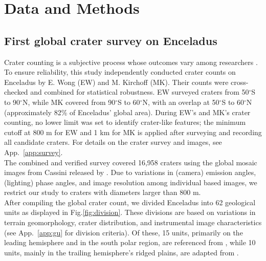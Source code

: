 \documentclass[preprint,12pt,3p,times,authoryear]{elsarticle}
\begin{document}

\section{Data and Methods} 
\label{sec:data}

\subsection{First global crater survey on Enceladus}
\label{subsec:crater_count}
Crater counting is a subjective process whose outcomes vary among researchers \citep{Robbins2014}. To ensure reliability, this study independently conducted crater counts on Enceladus by E. Wong (EW) and M. Kirchoff (MK). Their counts were cross-checked and combined for statistical robustness. EW surveyed craters from 50$^\circ$S to 90$^\circ$N, while MK covered from 90$^\circ$S to 60$^\circ$N, with an overlap at 50$^\circ$S to 60$^\circ$N (approximately 82\% of Enceladus' global area). During EW’s and MK’s crater counting, no lower limit was set to identify crater-like features; the minimum cutoff at 800 m for EW and 1 km for MK is applied after surveying and recording all candidate craters. For details on the crater survey and images, see App.~\ref{app:survey}.\\

The combined and verified survey covered 16,958 craters using the global mosaic images from Cassini released by \citet{Bland2018}. Due to variations in (camera) emission angles, (lighting) phase angles, and image resolution among individual based images, we restrict our study to craters with diameters larger than 800 m. \\

After compiling the global crater count, we divided Enceladus into 62 geological units as displayed in  Fig.\ref{fig:division}. These divisions are based on variations in terrain geomorphology, crater distribution, and instrumental image characteristics (see App.~\ref{app:gu} for division criteria).
Of these, 15 units, primarily on the leading hemisphere and in the south polar region, are referenced from \citet{CrowWillard2015}, while 10 units, mainly in the trailing hemisphere’s ridged plains, are adapted from \citet{Kirchoff2009}. \\
\end{document}
